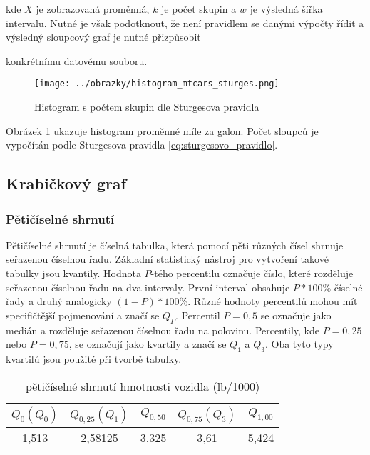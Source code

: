 kde $X$ je zobrazovaná proměnná, $k$ je počet skupin a $w$ je výsledná šířka intervalu. 
Nutné je však podotknout, že není pravidlem se danými výpočty řídit a výsledný
sloupcový graf je nutné přizpůsobit

konkrétnímu datovému souboru.

\begin{figure}[H]
    \centering
    \texttt{[image: ../obrazky/histogram\_mtcars\_sturges.png]}
    \caption{Histogram s počtem skupin dle Sturgesova pravidla} 
    \label{fig:histogram_mtcars_sturges}
\end{figure}

Obrázek \ref{fig:histogram_mtcars_sturges} ukazuje histogram proměnné míle za galon. Počet sloupců je vypočítán podle Sturgesova pravidla \ref{eq:sturgesovo_pravidlo}. 

\subsection{Krabičkový graf}
\subsubsection{Pětičíselné shrnutí}
Pětičíselné shrnutí je číselná tabulka, která pomocí pěti různých čísel shrnuje seřazenou číselnou řadu. Základní statistický nástroj pro
vytvoření takové tabulky jsou kvantily. Hodnota $P$-tého percentilu označuje číslo, které rozděluje seřazenou číselnou řadu na dva intervaly. 
První interval obsahuje $P*100\%$ číselné řady a druhý analogicky $(1-P)*100\%$. Různé hodnoty percentilů mohou mít specifičtější pojmenování a značí se $Q_P$.
Percentil $P = 0,5$ se označuje jako medián a rozděluje seřazenou číselnou řadu na polovinu. Percentily, kde $P = 0,25$ nebo $P = 0,75$, se označují
jako kvartily a značí se $Q_{1}$ a $Q_{3}$. Oba tyto typy kvartilů jsou použité při tvorbě tabulky.

\begin{table}[H]
    \centering
    \begin{tabular}[t]{c|c|c|c|c}
        \hline
        $Q_{0} (Q_0)$ & $Q_{0,25} (Q_1) $ & $Q_{0,50}$ & $Q_{0,75} (Q_3)$ & $Q_{1,00}$\\
        \hline
        1,513 & 2,58125 & 3,325 & 3,61 & 5,424\\
        \hline
    \end{tabular}
    \caption{\label{tab:five-number_summary}pětičíselné shrnutí hmotnosti vozidla (lb/1000)}
\end{table}


